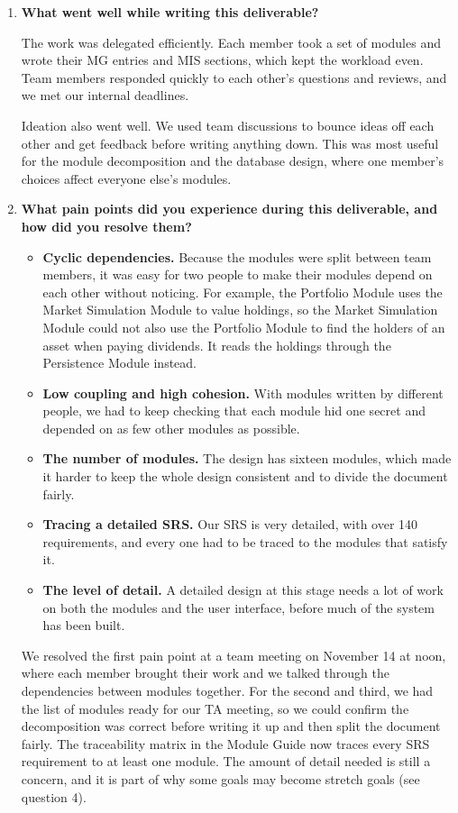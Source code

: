 \documentclass[12pt, titlepage]{article}
\begin{document}
\begin{enumerate}
  \item \textbf{What went well while writing this deliverable?}

  The work was delegated efficiently. Each member took a set of modules and
  wrote their MG entries and MIS sections, which kept the workload even.
  Team members responded quickly to each other's questions and reviews, and
  we met our internal deadlines.

  Ideation also went well. We used team discussions to bounce ideas off each
  other and get feedback before writing anything down. This was most useful
  for the module decomposition and the database design, where one member's
  choices affect everyone else's modules.

  \item \textbf{What pain points did you experience during this deliverable,
  and how did you resolve them?}

  \begin{itemize}
  \item \textbf{Cyclic dependencies.} Because the modules were split between
    team members, it was easy for two people to make their modules depend on
    each other without noticing. For example, the Portfolio Module uses the
    Market Simulation Module to value holdings, so the Market Simulation
    Module could not also use the Portfolio Module to find the holders of an
    asset when paying dividends. It reads the holdings through the
    Persistence Module instead.
  \item \textbf{Low coupling and high cohesion.} With modules written by
    different people, we had to keep checking that each module hid one secret
    and depended on as few other modules as possible.
  \item \textbf{The number of modules.} The design has sixteen modules, which
    made it harder to keep the whole design consistent and to divide the
    document fairly.
  \item \textbf{Tracing a detailed SRS.} Our SRS is very detailed, with over
    140 requirements, and every one had to be traced to the modules that
    satisfy it.
  \item \textbf{The level of detail.} A detailed design at this stage needs a
    lot of work on both the modules and the user interface, before much of the
    system has been built.
  \end{itemize}

  We resolved the first pain point at a team meeting on November 14 at noon,
  where each member brought their work and we talked through the
  dependencies between modules together. For the second and third, we had the
  list of modules ready for our TA meeting, so we could confirm the
  decomposition was correct before writing it up and then split the document
  fairly. The traceability matrix in the Module Guide now traces every SRS
  requirement to at least one module. The amount of detail needed is still a
  concern, and it is part of why some goals may become stretch goals (see
  question 4).


\end{enumerate}
\end{document}
